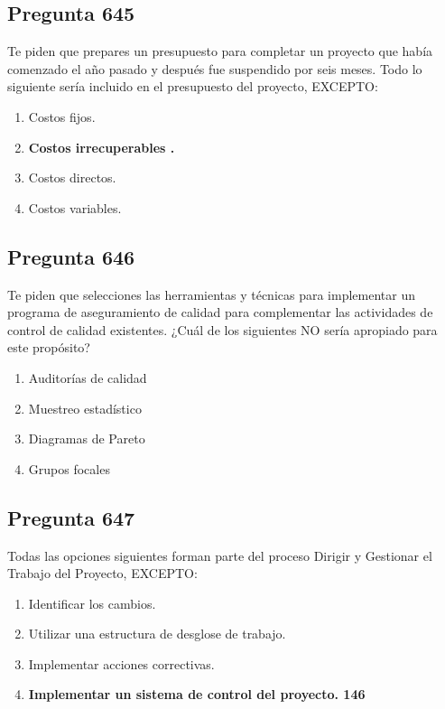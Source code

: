 \documentclass[11pt,a4paper]{article}
\begin{document}
\subsection*{Pregunta 645}
Te piden que prepares un presupuesto para completar un proyecto que había comenzado el año pasado y después fue suspendido por seis meses. Todo lo siguiente sería incluido en el presupuesto del proyecto, EXCEPTO:

\begin{enumerate}[label=\alph*)]
  \item Costos fijos.
  \item \textbf{Costos irrecuperables .}
  \item Costos directos.
  \item Costos variables.
\end{enumerate}

\subsection*{Pregunta 646}
Te piden que selecciones las herramientas y técnicas para implementar un programa de aseguramiento de calidad para complementar las actividades de control de calidad existentes. ¿Cuál de los siguientes NO sería apropiado para este propósito?

\begin{enumerate}[label=\alph*)]
  \item Auditorías de calidad
  \item Muestreo estadístico
  \item Diagramas de Pareto
  \item Grupos focales
\end{enumerate}

\subsection*{Pregunta 647}
Todas las opciones siguientes forman parte del proceso Dirigir y Gestionar el Trabajo del Proyecto, EXCEPTO:

\begin{enumerate}[label=\alph*)]
  \item Identificar los cambios.
  \item Utilizar una estructura de desglose de trabajo.
  \item Implementar acciones correctivas.
  \item \textbf{Implementar un sistema de control del proyecto. 146}
\end{enumerate}
\end{document}
